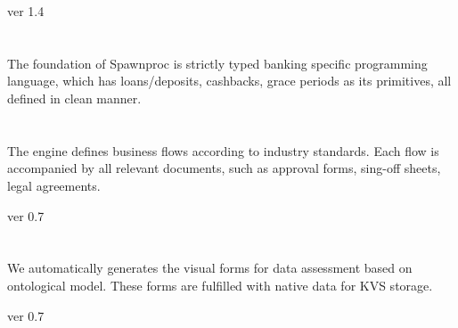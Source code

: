 \documentclass[11pt]{article}
\begin{document}
 ver 1.4


\section*{}
\paragraph{}
The foundation of Spawnproc is strictly typed banking specific
programming language, which has loans/deposits, cashbacks,
grace periods as its primitives, all defined in clean manner.


\section*{}
\paragraph{}
The engine defines business flows according to industry standards.
Each flow is accompanied by all relevant documents, such as
approval forms, sing-off sheets, legal agreements.

 ver 0.7

\section*{}
\paragraph{}
We automatically generates the visual forms for data assessment
based on ontological model. These forms are fulfilled with native
data for KVS storage.

 ver 0.7
\end{document}
